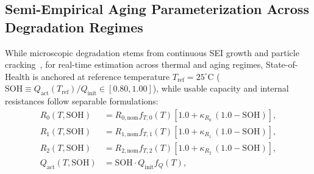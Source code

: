 \documentclass[balance,nocopyright,upint,varvw,hyphenate,barcolor=NavyBlue,nolists]{asmejour}
\begin{document}
\subsection{Semi-Empirical Aging Parameterization Across Degradation Regimes}
While microscopic degradation stems from continuous SEI growth and particle cracking~\cite{Birkl2017diagnostics,Ren2019aging}, for real-time estimation across thermal and aging regimes, State-of-Health is anchored at reference temperature $T_{\text{ref}} = 25^\circ\text{C}$ ($\text{SOH} \equiv Q_{\text{act}}(T_{\text{ref}})/Q_{\text{init}} \in [0.80, 1.00]$), while usable capacity and internal resistances follow separable formulations:
\begin{align}
R_0(T, \text{SOH}) &= R_{0,\text{nom}} f_{T,0}(T) [1.0 + \kappa_{R_0}\,(1.0 - \text{SOH})], \label{eqn:aging_r0}\\
R_1(T, \text{SOH}) &= R_{1,\text{nom}} f_{T,1}(T) [1.0 + \kappa_{R_1}\,(1.0 - \text{SOH})], \label{eqn:aging_r1}\\
R_2(T, \text{SOH}) &= R_{2,\text{nom}} f_{T,2}(T) [1.0 + \kappa_{R_2}\,(1.0 - \text{SOH})], \label{eqn:aging_r2}\\
Q_{\text{act}}(T, \text{SOH}) &= \text{SOH} \cdot Q_{\text{init}} f_Q(T), \label{eqn:aging_q}
\end{align}
\end{document}
